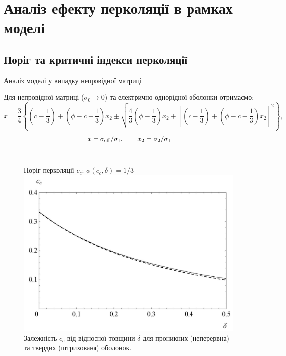 \documentclass[10pt]{beamer}
\begin{document}
\section{Аналіз ефекту перколяції в рамках моделі}%
\subsection{Поріг та критичні індекси перколяції}

\begin{frame}{Аналіз моделі у випадку непровідної матриці}
\footnotesize

Для непровідної матриці ($\sigma_0 \to 0$) та електрично однорідної оболонки отримаємо:
\begin{equation*}
    x = \frac{3}{4} \left\{ \left( c - \frac{1}{3} \right) + \left(\phi - c - \frac{1}{3} \right)x_2 \pm \sqrt{\frac{4}{3}\left( \phi - \frac{1}{3} \right) x_2 + \left[ \left( c - \frac{1}{3} \right) + \left( \phi - c - \frac{1}{3} \right)x_2 \right]^2 } \right\},
\end{equation*}
$$
     x = \sigma_{\rm eff}/\sigma_1, \qquad x_2 = \sigma_2/\sigma_1
$$

\begin{columns}[T,onlytextwidth]
      \begin{figure}
        \centering
        Поріг перколяції $c_c$: $\phi(c_c, \delta) = 1/3$
        \includegraphics[width=0.99\textwidth]{images/cc-delta.png}
        Залежність $c_c$ від відносної товщини $\delta$
для проникних (неперервна) та твердих (штрихована) оболонок.
      \end{figure}


\end{columns}
\end{frame}
\end{document}
